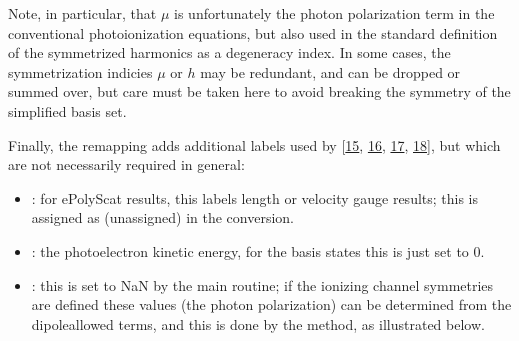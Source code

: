 \documentclass[letterpaper,table,10pt,english]{jupyterBook}
\begin{document}
\sphinxAtStartPar
Note, in particular, that \(\mu\) is \sphinxhyphen{} unfortunately \sphinxhyphen{} the photon polarization term in the conventional photoionization equations, but also used in the standard definition of the symmetrized harmonics as a degeneracy index. In some cases, the symmetrization indicies \(\mu\) or \(h\) may be redundant, and can be dropped or summed over, but care must be taken here to avoid breaking the symmetry of the simplified basis set.

\sphinxAtStartPar
Finally, the remapping adds additional labels used by  {[}\hyperlink{cite.backmatter/bibliography:id693}{15}, \hyperlink{cite.backmatter/bibliography:id567}{16}, \hyperlink{cite.backmatter/bibliography:id725}{17}, \hyperlink{cite.backmatter/bibliography:id696}{18}{]}, but which are not necessarily required in general:
\begin{itemize}
\item {} 
\sphinxAtStartPar
{}: for ePolyScat results, this labels length or velocity gauge results; this is assigned as  (unassigned) in the conversion.

\item {} 
\sphinxAtStartPar
{}: the photoelectron kinetic energy, for the basis states this is just set to 0.

\item {} 
\sphinxAtStartPar
{}: this is set to NaN by the main routine; if the ionizing channel symmetries are defined these values (the photon polarization) can be determined from the dipole\sphinxhyphen{}allowed terms, and this is done by the  method, as illustrated below.

\end{itemize}
\end{document}
